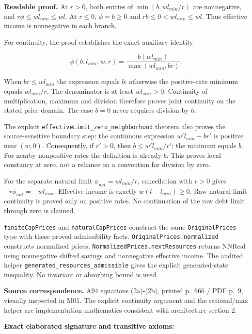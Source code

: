 \documentclass[
  11pt,
]{article}
\let\LedgerOriginalTexttt\texttt
\renewcommand{\texttt}[1]{{\small\LedgerOriginalTexttt{#1}}}
\begin{document}
\textbf{Readable proof.} At \(r>0\), both entries of
\(\min(b,w l_{min}/r)\) are nonnegative, and
\(r\phi\leq w l_{min}\leq w l\). At \(r\leq0\), \(\phi=b\geq0\) and
\(r b\leq0<w l_{min}\leq w l\). Thus effective income is nonnegative in
each branch.

For continuity, the proof establishes the exact auxiliary identity

\[\phi(b,l_{min},w,r)=\frac{b(w l_{min})}{\max(w l_{min},br)}.\]

When \(br\leq w l_{min}\) the expression equals \(b\); otherwise the
positive-rate minimum equals \(w l_{min}/r\). The denominator is at
least \(w l_{min}>0\). Continuity of multiplication, maximum and
division therefore proves joint continuity on the stated price domain.
The case \(b=0\) never requires division by \(b\).

The explicit \texttt{effectiveLimit\_zero\_neighborhood} theorem also
proves the source-sensitive boundary step: the continuous expression
\(w' l_{min}-b r'\) is positive near \((w,0)\). Consequently, if
\(r'>0\), then \(b\leq w'l_{min}/r'\); the minimum equals \(b\). For
nearby nonpositive rates the definition is already \(b\). This proves
local constancy at zero, not a reliance on a convention for division by
zero.

For the separate natural limit \(\phi_{nat}=w l_{min}/r\), cancellation
with \(r>0\) gives \(-r\phi_{nat}=-w l_{min}\). Effective income is
exactly \(w(l-l_{min})\geq0\). Raw natural-limit continuity is proved
only on positive rates. No continuation of the raw debt limit through
zero is claimed.

\texttt{finiteCapPrices} and \texttt{naturalCapPrices} construct the
same \texttt{OriginalPrices} type with these proved admissibility facts.
\texttt{OriginalPrices.normalized} constructs normalized prices;
\texttt{NormalizedPrices.nextResources} returns NNReal using nonnegative
shifted savings and nonnegative effective income. The audited helper
\texttt{generated\_resources\_admissible} gives the explicit
generated-state inequality. No invariant or absorbing bound is used.

\textbf{Source correspondence.} A94 equations (2a)-(2b), printed p.~666
/ PDF p.~9, visually inspected in M01. The explicit continuity argument
and the rational/max helper are implementation mathematics consistent
with architecture section 2.

\textbf{Exact elaborated signature and transitive axioms:}
\end{document}
